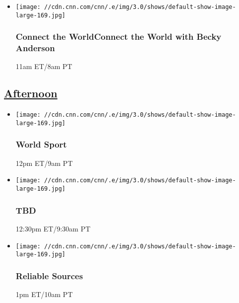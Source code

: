 \begin{itemize}
\item
  \texttt{[image: //cdn.cnn.com/cnn/.e/img/3.0/shows/default-show-image-large-169.jpg]}

  \hypertarget{connect-the-worldconnect-the-world-with-becky-anderson--1}{%
  \subsubsection{Connect the WorldConnect the World with Becky Anderson
  }\label{connect-the-worldconnect-the-world-with-becky-anderson--1}}

  11am ET/8am PT
\end{itemize}

\hypertarget{afternoon--1}{%
\subsection{\texorpdfstring{\href{/tv/schedule/cnn/index.html}{Afternoon}~}{Afternoon~}}\label{afternoon--1}}

\begin{itemize}
\item
  \texttt{[image: //cdn.cnn.com/cnn/.e/img/3.0/shows/default-show-image-large-169.jpg]}

  \hypertarget{world-sport-6}{%
  \subsubsection{World Sport}\label{world-sport-6}}

  12pm ET/9am PT
\end{itemize}

\begin{itemize}
\item
  \texttt{[image: //cdn.cnn.com/cnn/.e/img/3.0/shows/default-show-image-large-169.jpg]}

  \hypertarget{tbd-3}{%
  \subsubsection{TBD}\label{tbd-3}}

  12:30pm ET/9:30am PT
\end{itemize}

\begin{itemize}
\item
  \texttt{[image: //cdn.cnn.com/cnn/.e/img/3.0/shows/default-show-image-large-169.jpg]}

  \hypertarget{reliable-sources}{%
  \subsubsection{Reliable Sources}\label{reliable-sources}}

  1pm ET/10am PT
\end{itemize}

